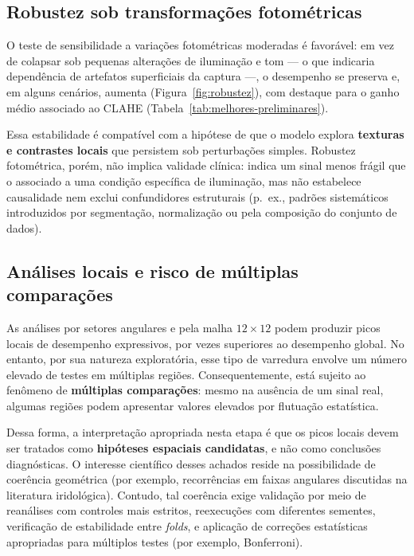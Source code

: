 \documentclass[11pt,a4paper]{article}
\begin{document}
\subsection{Robustez sob transformações fotométricas}
O teste de sensibilidade a variações fotométricas moderadas é favorável: em vez de colapsar sob pequenas alterações de iluminação e tom --- o que indicaria dependência de artefatos superficiais da captura ---, o desempenho se preserva e, em alguns cenários, aumenta (Figura~\ref{fig:robustez}), com destaque para o ganho médio associado ao CLAHE (Tabela~\ref{tab:melhores-preliminares}).

Essa estabilidade é compatível com a hipótese de que o modelo explora \textbf{texturas e contrastes locais} que persistem sob perturbações simples. Robustez fotométrica, porém, não implica validade clínica: indica um sinal menos frágil que o associado a uma condição específica de iluminação, mas não estabelece causalidade nem exclui confundidores estruturais (p.\ ex., padrões sistemáticos introduzidos por segmentação, normalização ou pela composição do conjunto de dados).

\subsection{Análises locais e risco de múltiplas comparações}
As análises por setores angulares e pela malha \(12\times 12\) podem produzir picos
locais de desempenho expressivos, por vezes superiores ao desempenho global. No
entanto, por sua natureza exploratória, esse tipo de varredura envolve um número
elevado de testes em múltiplas regiões. Consequentemente, está sujeito ao fenômeno
de \textbf{múltiplas comparações}: mesmo na ausência de um sinal real, algumas
regiões podem apresentar valores elevados por flutuação estatística.

Dessa forma, a interpretação apropriada nesta etapa é que os picos locais devem
ser tratados como \textbf{hipóteses espaciais candidatas}, e não como conclusões
diagnósticas. O interesse científico desses achados reside na possibilidade de
coerência geométrica (por exemplo, recorrências em faixas angulares discutidas na
literatura iridológica). Contudo, tal coerência exige validação por meio de
reanálises com controles mais estritos, reexecuções com diferentes sementes,
verificação de estabilidade entre \textit{folds}, e aplicação de correções
estatísticas apropriadas para múltiplos testes (por exemplo, Bonferroni). %
\end{document}
